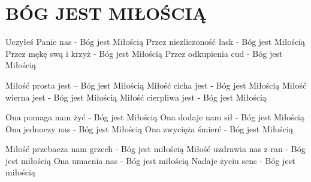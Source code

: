 \documentclass[../../../songbook.tex]{subfiles}
\begin{document}
\TabPositions{8cm} %
\section*{BÓG JEST MIŁOŚCIĄ}
{}
\vspace{0.5cm}
Uczyłeś Panie nas - Bóg jest Miłością			 \newline	
Przez niezliczoność łask - Bóg jest Miłością	 \newline	
Przez mękę swą i krzyż - Bóg jest Miłością		 \newline	
Przez odkupienia cud - Bóg jest Miłością		 \newline	

Miłość prosta jest – Bóg jest Miłością \newline	
Miłość cicha jest - Bóg jest Miłością \newline	
Miłość wierna jest - Bóg jest Miłością \newline	
Miłość cierpliwa jest - Bóg jest Miłością \newline	

Ona pomaga nam żyć - Bóg jest Miłością \newline	
Ona dodaje nam sił - Bóg jest Miłością \newline	
Ona jednoczy nas - Bóg jest Miłością \newline	
Ona zwycięża śmierć - Bóg jest Miłością \newline	

Miłość przebacza nam grzech - Bóg jest miłością  \newline	
Miłość uzdrawia nas z ran - Bóg jest miłością  \newline	
Ona umacnia nas - Bóg jest miłością  \newline	
Nadaje życiu sens - Bóg jest miłością \newline	
\end{document}
